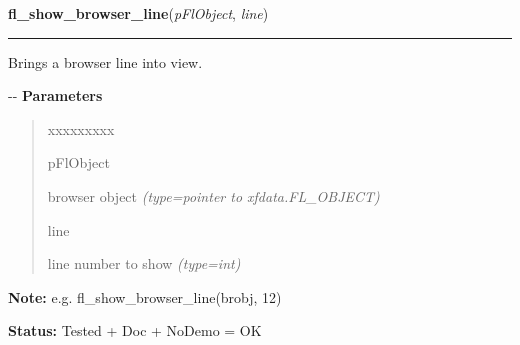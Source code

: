 \hspace{.8\funcindent}\begin{boxedminipage}{\funcwidth}

    \raggedright \textbf{fl\_show\_browser\_line}(\textit{pFlObject}, \textit{line})

    \vspace{-1.5ex}

    \rule{\textwidth}{0.5\fboxrule}
\setlength{\parskip}{2ex}

Brings a browser line into view.

-{}-
\setlength{\parskip}{1ex}
      \textbf{Parameters}
      \vspace{-1ex}

      \begin{quote}
        \begin{Ventry}{xxxxxxxxx}

          \item[pFlObject]


browser object
            {\it (type=pointer to xfdata.FL\_OBJECT)}

          \item[line]


line number to show
            {\it (type=int)}

        \end{Ventry}

      \end{quote}

\textbf{Note:} 
e.g. fl\_show\_browser\_line(brobj, 12)


\textbf{Status:} 
Tested + Doc + NoDemo = OK


    \end{boxedminipage}

    \label{xformslib:flbrowser:fl_set_browser_hscroll_callback}

    \vspace{0.5ex}

